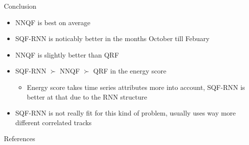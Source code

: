 \documentclass[10pt,aspectratio=169]{beamer}
\begin{document}
\begin{frame}{Conclusion}
    \begin{itemize}
        \item NNQF is best on average
        \item SQF-RNN is noticably better in the months October till Febuary
        \item NNQF is slightly better than QRF
        \item SQF-RNN \(\succ\) NNQF \(\succ\) QRF in the energy score
        \begin{itemize}
            \item Energy score takes time series attributes more into account, SQF-RNN is better at that due to the RNN structure
        \end{itemize}
        \item SQF-RNN is not really fit for this kind of problem, usually uses way more different correlated tracks
    \end{itemize}
\end{frame}

\begin{frame}{References}
    \printbibliography[heading=none]
\end{frame}
\end{document}
